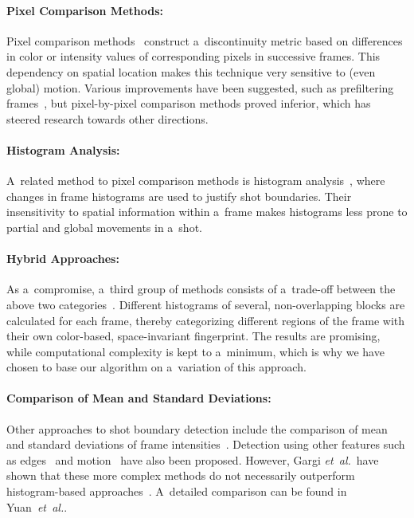 \paragraph{Pixel Comparison Methods:}

Pixel comparison methods~\cite{hampapur1994videosegmentation,
zhang1993videopartitioning} construct a~discontinuity metric
based on differences in color or intensity values
of corresponding pixels in successive frames.
This dependency on spatial location makes this technique
very sensitive to (even global) motion.
Various improvements have been suggested, such as prefiltering
frames~\cite{zhang1995videoparsing},
but pixel-by-pixel comparison methods proved inferior,
which has steered research towards other directions.

\paragraph{Histogram Analysis:}

A~related method to pixel comparison methods is
histogram analysis~\cite{otoole1999shotboundary},
where changes in frame histograms are used
to justify shot boundaries.
Their insensitivity to spatial information
within a~frame makes histograms less prone to partial
and global movements in a~shot.

\paragraph{Hybrid Approaches:}

As a~compromise, a~third group of methods consists of
a~trade-off between the above two
categories~\cite{ahmed1999keyframe}.
Different histograms of several, non-overlapping blocks
are calculated for each frame,
thereby categorizing different regions of the frame
with their own color-based, space-invariant fingerprint.
The results are promising, while computational complexity
is kept to a~minimum, which is why we have chosen
to base our algorithm on a~variation of this approach.

\paragraph{Comparison of Mean and Standard Deviations:}

Other approaches to shot boundary detection include
the comparison of mean and standard deviations
of frame intensities~\cite{lienhart1999comparison}.
Detection using other features such as
edges~\cite{zabih1995scenebreaks} and
motion~\cite{bouthemy1997shotchange} have also been proposed.
However, Gargi \emph{et~al.}\ have shown that
these more complex methods do not necessarily
outperform histogram-based approaches~\cite{gargi2000videoshot}.
A~detailed comparison can be found in
Yuan~\emph{et~al.}\cite{yuan2007shotboundary}.

